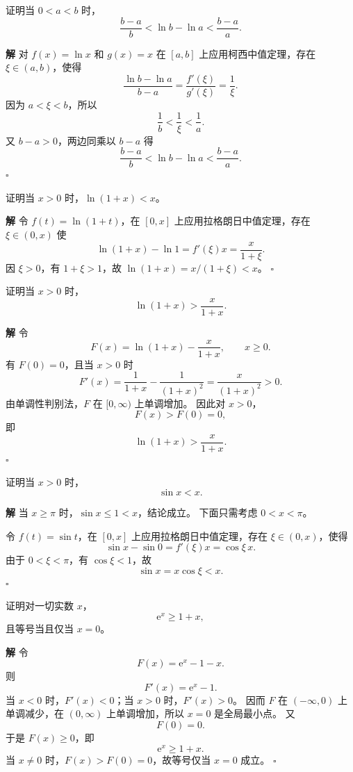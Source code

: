 \documentclass[fontset=fandol]{ctexart}
\newenvironment{solution}{\par\noindent\textbf{解}\quad}{\hfill$\square$\par\vspace{0.8em}}
\newcommand{\ee}{\mathrm{e}}
\begin{document}
\begin{example}[用柯西中值定理证明不等式]
证明当 $0<a<b$ 时，
\[
\frac{b-a}{b}<\ln b-\ln a<\frac{b-a}{a}.
\]
\end{example}
\begin{solution}
对 $f(x)=\ln x$ 和 $g(x)=x$ 在 $[a,b]$ 上应用柯西中值定理，存在 $\xi\in(a,b)$，使得
\[
\frac{\ln b-\ln a}{b-a}=\frac{f'(\xi)}{g'(\xi)}=\frac1{\xi}.
\]
因为 $a<\xi<b$，所以
\[
\frac1b<\frac1\xi<\frac1a.
\]
又 $b-a>0$，两边同乘以 $b-a$ 得
\[
\frac{b-a}{b}<\ln b-\ln a<\frac{b-a}{a}.
\]
\end{solution}

\begin{example}[不等式]
证明当 $x>0$ 时，$\ln(1+x)<x$。
\end{example}
\begin{solution}
令 $f(t)=\ln(1+t)$，在 $[0,x]$ 上应用拉格朗日中值定理，存在 $\xi\in(0,x)$ 使
\[
\ln(1+x)-\ln1=f'(\xi)x=\frac{x}{1+\xi}.
\]
因 $\xi>0$，有 $1+\xi>1$，故 $\ln(1+x)=x/(1+\xi)<x$。
\end{solution}

\begin{example}[不等式]
证明当 $x>0$ 时，
\[
\ln(1+x)>\frac{x}{1+x}.
\]
\end{example}
\begin{solution}
令
\[
F(x)=\ln(1+x)-\frac{x}{1+x},\qquad x\geq0.
\]
有 $F(0)=0$，且当 $x>0$ 时
\[
F'(x)=\frac1{1+x}-\frac1{(1+x)^2}
=\frac{x}{(1+x)^2}>0.
\]
由单调性判别法，$F$ 在 $[0,\infty)$ 上单调增加。 因此对 $x>0$，
\[
F(x)>F(0)=0,
\]
即
\[
\ln(1+x)>\frac{x}{1+x}.
\]
\end{solution}

\begin{example}[三角函数不等式]
证明当 $x>0$ 时，
\[
\sin x<x.
\]
\end{example}
\begin{solution}
当 $x\geq\pi$ 时，$\sin x\leq1<x$，结论成立。 下面只需考虑 $0<x<\pi$。

令 $f(t)=\sin t$，在 $[0,x]$ 上应用拉格朗日中值定理，存在 $\xi\in(0,x)$，使得
\[
\sin x-\sin0=f'(\xi)x=\cos\xi\,x.
\]
由于 $0<\xi<\pi$，有 $\cos\xi<1$，故
\[
\sin x=x\cos\xi<x.
\]
\end{solution}

\begin{example}[指数函数不等式]
证明对一切实数 $x$，
\[
\ee^x\geq1+x,
\]
且等号当且仅当 $x=0$。
\end{example}
\begin{solution}
令
\[
F(x)=\ee^x-1-x.
\]
则
\[
F'(x)=\ee^x-1.
\]
当 $x<0$ 时，$F'(x)<0$；当 $x>0$ 时，$F'(x)>0$。 因而 $F$ 在 $(-\infty,0)$ 上单调减少，在 $(0,\infty)$ 上单调增加，所以 $x=0$ 是全局最小点。 又
\[
F(0)=0.
\]
于是 $F(x)\geq0$，即
\[
\ee^x\geq1+x.
\]
当 $x\neq0$ 时，$F(x)>F(0)=0$，故等号仅当 $x=0$ 成立。
\end{solution}
\end{document}
